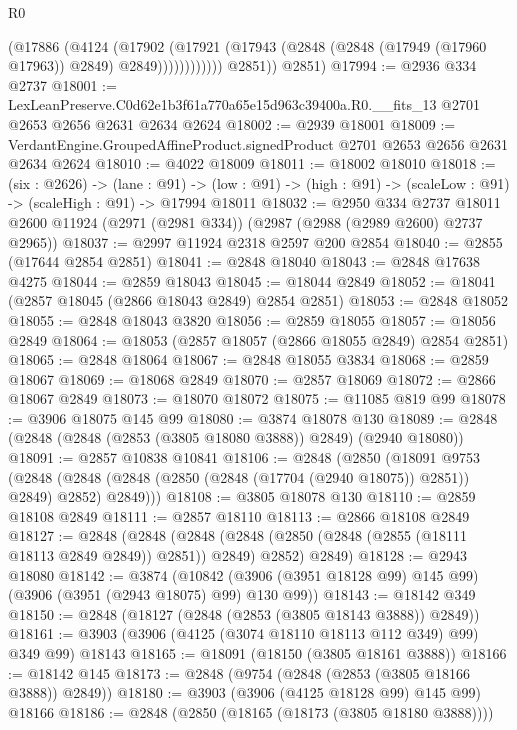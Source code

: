 \begin{lexlean}{R0}
\begin{coremodule}
                      (@17886
                        (@4124
                          (@17902
                            (@17921
                              (@17943
                                (@2848 (@2848 (@17949 (@17960 @17963)) @2849) @2849))))))))))))
          @2851))
      @2851)
@17994 := @2936 @334 @2737
@18001 := LexLeanPreserve.C0d62e1b3f61a770a65e15d963c39400a.R0.__fits_13
    @2701
    @2653
    @2656
    @2631
    @2634
    @2624
@18002 := @2939 @18001
@18009 := VerdantEngine.GroupedAffineProduct.signedProduct @2701 @2653 @2656 @2631 @2634 @2624
@18010 := @4022 @18009
@18011 := @18002 @18010
@18018 := (six : @2626) ->
  (lane : @91) ->
  (low : @91) -> (high : @91) -> (scaleLow : @91) -> (scaleHigh : @91) -> @17994 @18011
@18032 := @2950
    @334
    @2737
    @18011
    @2600
    @11924
    (@2971 (@2981 @334))
    (@2987 (@2988 (@2989 @2600) @2737 @2965))
@18037 := @2997 @11924 @2318 @2597 @200 @2854
@18040 := @2855 (@17644 @2854 @2851)
@18041 := @2848 @18040
@18043 := @2848 @17638 @4275
@18044 := @2859 @18043
@18045 := @18044 @2849
@18052 := @18041 (@2857 @18045 (@2866 @18043 @2849) @2854 @2851)
@18053 := @2848 @18052
@18055 := @2848 @18043 @3820
@18056 := @2859 @18055
@18057 := @18056 @2849
@18064 := @18053 (@2857 @18057 (@2866 @18055 @2849) @2854 @2851)
@18065 := @2848 @18064
@18067 := @2848 @18055 @3834
@18068 := @2859 @18067
@18069 := @18068 @2849
@18070 := @2857 @18069
@18072 := @2866 @18067 @2849
@18073 := @18070 @18072
@18075 := @11085 @819 @99
@18078 := @3906 @18075 @145 @99
@18080 := @3874 @18078 @130
@18089 := @2848 (@2848 (@2848 (@2853 (@3805 @18080 @3888)) @2849) (@2940 @18080))
@18091 := @2857 @10838 @10841
@18106 := @2848
    (@2850
      (@18091
        @9753
        (@2848 (@2848 (@2848 (@2850 (@2848 (@17704 (@2940 @18075)) @2851)) @2849) @2852) @2849)))
@18108 := @3805 @18078 @130
@18110 := @2859 @18108 @2849
@18111 := @2857 @18110
@18113 := @2866 @18108 @2849
@18127 := @2848
    (@2848
      (@2848 (@2848 (@2850 (@2848 (@2855 (@18111 @18113 @2849 @2849)) @2851)) @2849) @2852)
      @2849)
@18128 := @2943 @18080
@18142 := @3874
    (@10842 (@3906 (@3951 @18128 @99) @145 @99) (@3906 (@3951 (@2943 @18075) @99) @130 @99))
@18143 := @18142 @349
@18150 := @2848 (@18127 (@2848 (@2853 (@3805 @18143 @3888)) @2849))
@18161 := @3903 (@3906 (@4125 (@3074 @18110 @18113 @112 @349) @99) @349 @99) @18143
@18165 := @18091 (@18150 (@3805 @18161 @3888))
@18166 := @18142 @145
@18173 := @2848 (@9754 (@2848 (@2853 (@3805 @18166 @3888)) @2849))
@18180 := @3903 (@3906 (@4125 @18128 @99) @145 @99) @18166
@18186 := @2848 (@2850 (@18165 (@18173 (@3805 @18180 @3888))))

\end{coremodule}
\end{lexlean}
